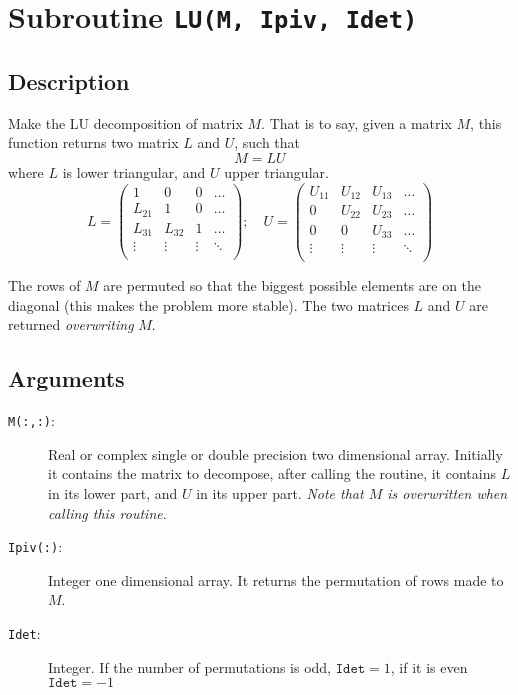 \section{Subroutine \texttt{LU(M, Ipiv, Idet)}}

\subsection{Description}

Make the LU decomposition of matrix $M$. That is to say, given a
matrix $M$, this function returns two matrix $L$ and $U$, such that
\begin{equation}
  M = LU
\end{equation}
where $L$ is lower triangular, and $U$ upper triangular.
\begin{equation}
  L = \left(
    \begin{array}{cccc}
      1 & 0 & 0 &\dots \\
      L_{21} & 1 & 0 &\dots \\
      L_{31} & L_{32} & 1 &\dots \\
      \vdots & \vdots  & \vdots &\ddots \\
    \end{array}
  \right);\quad
  U = \left(
    \begin{array}{cccc}
      U_{11} & U_{12} & U_{13} &\dots \\
      0 & U_{22} & U_{23} &\dots \\
      0 & 0 & U_{33} &\dots \\
      \vdots & \vdots  & \vdots &\ddots \\
    \end{array}
  \right)
\end{equation}

The rows of $M$ are permuted so that the biggest possible elements are
on the diagonal (this makes the problem more stable). The two matrices
$L$ and $U$ are returned \emph{overwriting} $M$. 

\subsection{Arguments}

\begin{description}
\item[\texttt{M(:,:)}: ] Real or complex single or double precision
  two dimensional 
  array. Initially it contains the matrix to decompose, after calling
  the routine, it contains $L$ in its lower part, and $U$ in its upper
  part. \emph{Note that $M$ is overwritten when calling this routine}.
\item[\texttt{Ipiv(:)}: ] Integer one dimensional array. It returns
  the permutation of rows made to $M$.
\item[\texttt{Idet}: ] Integer. If the number of permutations is odd,
  $\mathtt{Idet}=1$, if it is even $\mathtt{Idet}=-1$
\end{description}

